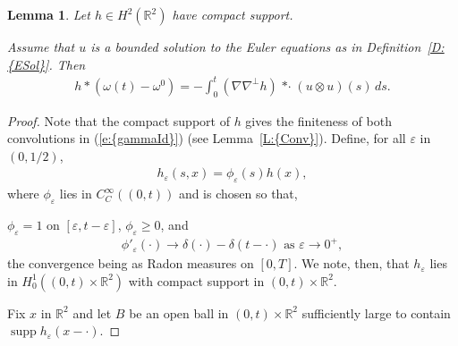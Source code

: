 \documentclass[reqno,openright,11pt,twoside]{amsart}
\newtheorem{lemma}[theorem]{Lemma}
\theoremstyle{definition}
\numberwithin{equation}{section}
\begin{document}
\begin{lemma}\label{L:gammaLemma}
	Let $h \in H^2({\ensuremath{{\ensuremath{\mathbb{{R}}}}}}^2)$ have compact support.
	
	
	
	Assume that $u$ is a bounded solution to the Euler equations as in {Definition~\ref{D:{ESol}}}.
	Then
	\begin{align}\label{e:gammaId}
		h * (\omega(t) - \omega^0)
			= - \int_0^t ({\ensuremath{\nabla}} {\ensuremath{\nabla}}^\perp h) {\mathop{* \cdot}} (u \otimes u)(s) \, ds.
	\end{align}
\end{lemma}
\begin{proof}
	Note that the compact support of $h$ gives the finiteness of both convolutions in {(\ref{e:{gammaId}})}
	(see {Lemma~\ref{L:{Conv}}}).	
	Define, for all ${\ensuremath{\varepsilon}}$ in $(0, 1/2)$,
	\begin{align*}
		h_{\ensuremath{\varepsilon}}(s, x)
			= \phi_{\ensuremath{\varepsilon}}(s) h(x),
	\end{align*}
	where $\phi_{\ensuremath{\varepsilon}}$ lies in $C^{\ensuremath{\infty}}_C((0, t))$ and is chosen so that,
	
	$\phi_{\ensuremath{\varepsilon}} = 1$ on $[{\ensuremath{\varepsilon}}, t - {\ensuremath{\varepsilon}}]$,
	$\phi_{\ensuremath{\varepsilon}} \ge 0$, and
	\begin{align*}
		\phi'_{\ensuremath{\varepsilon}}(\cdot)
			\to \delta(\cdot) - \delta(t - \cdot)
			
			\text{ as } {\ensuremath{\varepsilon}} \to 0^+,
	\end{align*}
	the convergence being as Radon measures on $[0, T]$.
	We note, then, that $h_{\ensuremath{\varepsilon}}$ lies in $H_0^1((0, t) \times {\ensuremath{{\ensuremath{\mathbb{{R}}}}}}^2)$ with compact support
	in $(0, t) \times {\ensuremath{{\ensuremath{\mathbb{{R}}}}}}^2$.
	
	Fix $x$ in ${\ensuremath{{\ensuremath{\mathbb{{R}}}}}}^2$ and let $B$ be an open ball in $(0, t) \times {\ensuremath{{\ensuremath{\mathbb{{R}}}}}}^2$ sufficiently large
	to contain $\operatorname{supp} h_{\ensuremath{\varepsilon}}(x - \cdot)$.
	


\end{proof}
\end{document}
